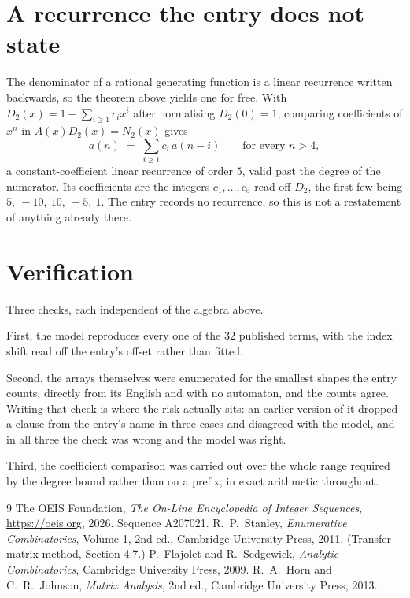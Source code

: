 \documentclass[11pt,a4paper]{article}
\theoremstyle{plain}
\theoremstyle{definition}
\begin{document}
\section{A recurrence the entry does not state}

The denominator of a rational generating function is a linear recurrence written backwards, so
the theorem above yields one for free. With $D_2(x)=1-\sum_{i\ge1}c_ix^i$ after normalising
$D_2(0)=1$, comparing coefficients of $x^n$ in $A(x)D_2(x)=N_2(x)$ gives
\[
a(n)\;=\;\sum_{i\ge1}c_i\,a(n-i)\qquad\text{for every }n>4,
\]
a constant-coefficient linear recurrence of order $5$, valid past the degree of the
numerator. Its coefficients are the integers $c_1,\dots,c_{5}$ read off $D_2$, the first few being $5,\ -10,\ 10,\ -5,\ 1$. The entry records no recurrence, so this is not a restatement of anything
already there.

\section{Verification}

Three checks, each independent of the algebra above.

First, the model reproduces every one of the $32$ published terms, with the index shift
read off the entry's offset rather than fitted.

Second, the arrays themselves were enumerated for the smallest shapes the entry counts,
directly from its English and with no automaton, and the counts agree. Writing that check is
where the risk actually sits: an earlier version of it dropped a clause from the entry's name
in three cases and disagreed with the model, and in all three the check was wrong and the model
was right.

Third, the coefficient comparison was carried out over the whole range required by the degree
bound rather than on a prefix, in exact arithmetic throughout.

\begin{thebibliography}{9}
 The OEIS Foundation, \emph{The On-Line Encyclopedia of Integer
Sequences}, \url{https://oeis.org}, 2026. Sequence A207021.
 R.~P.~Stanley, \emph{Enumerative Combinatorics}, Volume 1, 2nd ed.,
Cambridge University Press, 2011. (Transfer-matrix method, Section 4.7.)
 P.~Flajolet and R.~Sedgewick, \emph{Analytic Combinatorics}, Cambridge
University Press, 2009.
 R.~A.~Horn and C.~R.~Johnson, \emph{Matrix Analysis}, 2nd ed., Cambridge
University Press, 2013.
\end{thebibliography}
\end{document}
